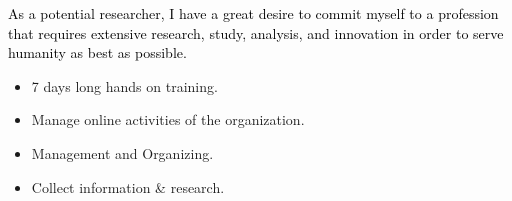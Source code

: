 \documentclass[10pt,a4paper,ragged2e,withhyper]{altacv}
\begin{document}
\begin{paracol}{2}
		
		
		
		\newpage
		
		\switchcolumn
		
		\begin{justify}
			\textcolor{black}{As a potential researcher, I have a great desire to commit myself to a profession that requires extensive research, study, analysis, and innovation in order to serve humanity as best as possible.}
		\end{justify}
		
		\medskip
		
		\begin{itemize}
			\item 7 days long hands on training.
			\item Manage online activities of the organization.
		\end{itemize}
		\divider
		
		\begin{itemize}
			\item Management and Organizing.
			\item Collect information \& research.
		\end{itemize}
		\divider
		

\end{paracol}
\end{document}
